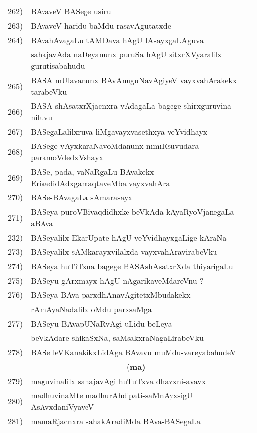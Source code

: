{\begin{longtable}{@{}cp{7.4cm}r}
262) & BAvaveV BASege usiru & \pageref{page9}\\
263) & BAvaveV haridu baMdu rasavAgutatxde & \pageref{page229}\\
264) & BAvahAvagaLu tAMDava hAgU lAsayxgaLAguva & \\
     & sahajavAda naDeyanunx puruSa hAgU sitxrXVyaralilx gurutisabahudu & \pageref{page226}\\
265) & BASA mUlavanunx BAvAnuguNavAgiyeV vayxvahArakekx tarabeVku & \pageref{page10}\\
266) & BASA shAsatxrXjacnxra vAdagaLa bagege shirxguruvina niluvu & \pageref{page05}\\
267) & BASegaLalilxruva liMgavayxvasethxya veYvidhayx & \pageref{page17}\\
268) & BASege vAyxkaraNavoMdanunx nimiRsuvudara paramoVdedxVshayx & \pageref{page34}\\
269) & BASe, pada, vaNaRgaLu BAvakekx ErisadidAdxgamaqtaveMba vayxvahAra & \pageref{page185}\\
270) & BASe-BAvagaLa sAmarasayx & \pageref{page24}\\
271) & BASeya puroVBivaqdidhxke beVkAda kAyaRyoVjanegaLa aBAva & \pageref{page31}\\
232) & BASeyalilx EkarUpate hAgU veYvidhayxgaLige kAraNa & \pageref{page11}\\
273) & BASeyalilx sAMkarayxvilalxda vayxvahAravirabeVku & \pageref{page174}\\  
274) & BASeya huTiTxna bagege BASAshAsatxrXda thiyarigaLu & \pageref{page3}\\
275) & BASeyu gArxmayx hAgU nAgarikaveMdareVnu ? & \pageref{page11}\\
276) & BASeya BAva parxdhAnavAgitetxMbudakekx & \\
     & rAmAyaNadalilx oMdu parxsaMga & \pageref{page13}\\
277) & BASeyu BAvapUNaRvAgi uLidu beLeya  & \\
     & beVkAdare shikaSxNa, saMsakxraNagaLirabeVku & \pageref{page16}\\
278) & BASe leVKanakikxLidAga BAvavu muMdu-vareyabahudeV & \pageref{page186}\\[0.3cm]
     &  \multicolumn{1}{c}{\textbf{(ma)}} & \\[0.3cm]
279) & maguvinalilx sahajavAgi huTuTxva dhavxni-avavx & \pageref{page6}\\
280) & madhuvinaMte madhurAhdipati-saMnAyxsigU AsAvxdaniVyaveV & \pageref{page283}\\
281) & mamaRjacnxra sahakAradiMda BAva-BASegaLa &  \\

\end{longtable}}
